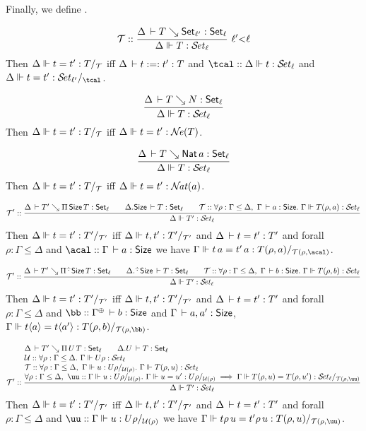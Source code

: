 \documentclass[acmlarge,review,anonymous]{acmart}\settopmatter{printfolios=true}
\begin{document}
Finally, we define .
\begin{caselist}


\nextcase
\[
  \T ::
  \rux{\Delta \der T \evalsto \Set[\ell'] : \Set[\ell]
     }{\sty \Delta T \ell
     }{\ell' {<} \ell}
\]
Then $\sttmeqd \Delta t {t'} T {\T} {\tcal}$ iff
$\Delta \,\vdash t :=: t' : T$ and
$\tcal :: \sty \Delta {t} \ell$ and
$\steqd \Delta t {t'} {\ell'} {\tcal}$.

\nextcase
\[
  \ru{\Delta \der T \evalsto N : \Set[\ell]
    }{\sty \Delta T \ell}
\]
Then $\Delta \Vdash t = t' : T /_{\mathcal{T}}$ iff $\Delta \Vdash t = t' : \mathcal{N}\!\mathit{e}(T)$.

\nextcase
\[
  \ru{\Delta \der T \evalsto \Nat a : \Set[\ell]
    }{\sty \Delta T \ell}
\]
Then $\Delta \Vdash t = t' : T /_{\mathcal{T}}$ iff $\Delta \Vdash t = t' : {\mathcal{N}\!\mathit{at}}(a)$.

\nextcase %
\[
  \T' ::
  \rul{\Delta \der T' \evalsto \piT \Size T : \Set[\ell] \qquad
       \cext \Delta \Size \der T : \Set[\ell] \qquad
      \T :: \forall \rho : \Gamma \leq \Delta,~\Gamma \der a : \Size.~
        \sty \Gamma {T(\rho,a)} \ell \\
    }{\sty \Delta {T'} \ell}
\]
Then $\Delta \Vdash t = t' : T' /_{\mathcal{T}'}$ iff
$\Delta \Vdash t,t' : T' /_{\mathcal{T}'}$ and
$\Delta \,\vdash t = t' : T'$ and
forall $\rho : \Gamma \leq \Delta$ and $\acal :: \Gamma \der a : \Size$
we have $\stmeqd \Gamma {t\,a} {t'\,a} {T(\rho,a)} {\T(\rho,\acal)}$.

\nextcase %
\[
  \T' ::
  \rul{\Delta \der T' \evalsto \erpiT \Size T : \Set[\ell] \qquad
       \erext \Delta \Size \der T : \Set[\ell] \qquad
      \T :: \forall \rho : \Gamma \leq \Delta,~\Gamma \der b : \Size.~
        \sty \Gamma {T(\rho,b)} \ell \\
    }{\sty \Delta {T'} \ell}
\]
Then $\Delta \Vdash t = t' : T' /_{\mathcal{T}'}$ iff
$\Delta \Vdash t,t' : T' /_{\mathcal{T}'}$ and
$\Delta \,\vdash t = t' : T'$ and
forall $\rho : \Gamma \leq \Delta$ and $\bb :: \resurrect\Gamma \der b : \Size$ and  $\Gamma \,\vdash a,a' : \mathsf{Size}$,
$\sttmeqd \Gamma {t \ann a} {t \ann {a'}} {T(\rho,b)} {\T(\rho,\bb)} {\tcal}$.


\nextcase
\[
  \T' ::
  \rul{\Delta \der T' \evalsto \piT U T : \Set[\ell] \qquad \cext \Delta U \der T : \Set[\ell] \\ \relax
      \U :: \forall \rho : \Gamma \leq \Delta.~ \sty{\Gamma}{U\rho} {\ell} \\ \relax
      \T :: \forall \rho : \Gamma \leq \Delta,~\sttmd \Gamma u {U\rho} {\U(\rho)}.~
        \sty \Gamma {T(\rho,u)} \ell \\
      \forall \rho : \Gamma \leq \Delta,~ \uu :: \sttmd \Gamma u {U\rho} {\U(\rho)}.~
        \sttmeqd \Gamma u {u'} {U\rho} {\U(\rho)} {\uu} \implies
        \steqd \Gamma {T(\rho,u)} {T(\rho,u')} \ell {\T(\rho,\uu)}
    }{\sty \Delta {T'} \ell}
\]
Then $\Delta \Vdash t = t' : T' /_{\mathcal{T}'}$ iff
$\Delta \Vdash t,t' : T' /_{\mathcal{T}'}$ and
$\Delta \,\vdash t = t' : T'$ and
forall $\rho : \Gamma \leq \Delta$ and
$\uu :: \sttmd \Gamma u {U\rho} {\U(\rho)}$
we have $\stmeqd \Gamma {t\rho\,u} {t'\rho\,u} {T(\rho,u)} {\T(\rho,\uu)}$.



\end{caselist}
\end{document}
